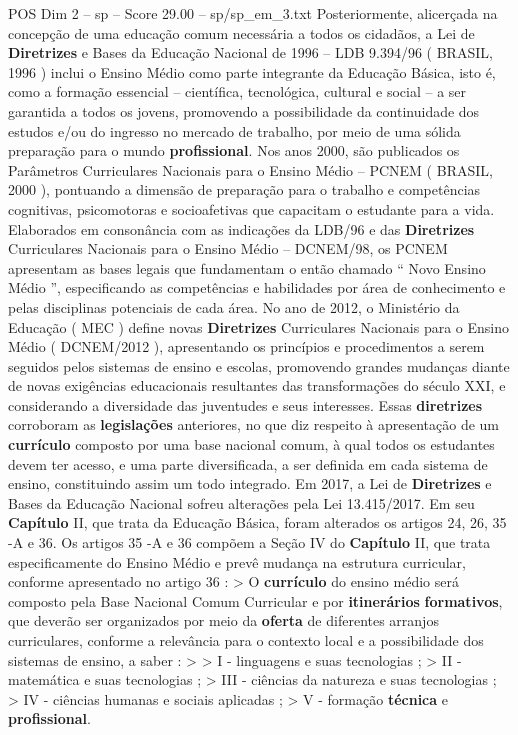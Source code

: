 \begin{textsample}{POS Dim 2 – sp – Score 29.00 – sp/sp\_em\_3.txt}
Posteriormente, alicerçada na concepção de uma educação comum necessária a todos os cidadãos, a Lei de \textbf{Diretrizes} e Bases da Educação Nacional de 1996 – LDB 9.394/96 ( BRASIL, 1996 ) inclui o Ensino Médio como parte integrante da Educação Básica, isto é, como a formação essencial – científica, tecnológica, cultural e social – a ser garantida a todos os jovens, promovendo a possibilidade da continuidade dos estudos e/ou do ingresso no mercado de trabalho, por meio de uma sólida preparação para o mundo \textbf{profissional}.
Nos anos 2000, são publicados os Parâmetros Curriculares Nacionais para o Ensino Médio – PCNEM ( BRASIL, 2000 ), pontuando a dimensão de preparação para o trabalho e competências cognitivas, psicomotoras e socioafetivas que capacitam o estudante para a vida.
Elaborados em consonância com as indicações da LDB/96 e das \textbf{Diretrizes} Curriculares Nacionais para o Ensino Médio – DCNEM/98, os PCNEM apresentam as bases legais que fundamentam o então chamado “ Novo Ensino Médio ”, especificando as competências e habilidades por área de conhecimento e pelas disciplinas potenciais de cada área.
No ano de 2012, o Ministério da Educação ( MEC ) define novas \textbf{Diretrizes} Curriculares Nacionais para o Ensino Médio ( DCNEM/2012 ), apresentando os princípios e procedimentos a serem seguidos pelos sistemas de ensino e escolas, promovendo grandes mudanças diante de novas exigências educacionais resultantes das transformações do século XXI, e considerando a diversidade das juventudes e seus interesses.
Essas \textbf{diretrizes} corroboram as \textbf{legislações} anteriores, no que diz respeito à apresentação de um \textbf{currículo} composto por uma base nacional comum, à qual todos os estudantes devem ter acesso, e uma parte diversificada, a ser definida em cada sistema de ensino, constituindo assim um todo integrado.
Em 2017, a Lei de \textbf{Diretrizes} e Bases da Educação Nacional sofreu alterações pela Lei 13.415/2017.
Em seu \textbf{Capítulo} II, que trata da Educação Básica, foram alterados os artigos 24, 26, 35 -A e 36.
Os artigos 35 -A e 36 compõem a Seção IV do \textbf{Capítulo} II, que trata especificamente do Ensino Médio e prevê mudança na estrutura curricular, conforme apresentado no artigo 36 : > O \textbf{currículo} do ensino médio será composto pela Base Nacional Comum Curricular e por \textbf{itinerários} \textbf{formativos}, que deverão ser organizados por meio da \textbf{oferta} de diferentes arranjos curriculares, conforme a relevância para o contexto local e a possibilidade dos sistemas de ensino, a saber : > > I - linguagens e suas tecnologias ; > II - matemática e suas tecnologias ; > III - ciências da natureza e suas tecnologias ; > IV - ciências humanas e sociais aplicadas ; > V - formação \textbf{técnica} e \textbf{profissional}.

\end{textsample}
